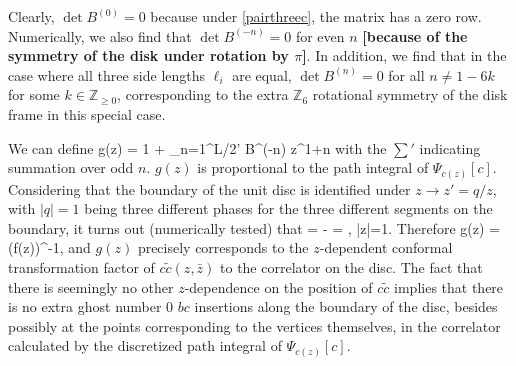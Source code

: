 \documentclass[12pt]{article}
\newcommand{\wt}[1]{\widetilde{#1}}
\newcommand{\fixme}[1]{{\bf {\color{red}[#1]}}}
\begin{document}
Clearly, $\det B^{(0)} = 0$ because under \eqref{pairthreec}, the matrix has a zero row. Numerically, we also find that $\det B^{(-n)} = 0$ for even $n$ \fixme{because of the symmetry of the disk under rotation by $\pi$}. In addition, we find that in the case where all three side lengths $\ell_i$ are equal, $\det B^{(n)} = 0$ for all $n \neq 1-6k$ for some $k\in \mathbb{Z}_{\geq 0}$, corresponding to the extra $\mathbb{Z}_6$ rotational symmetry of the disk frame in this special case.

We can define
\ie
g(z) = 1 + \sum_{n=1}^{L/2}{}' \det B^{(-n)} z^{1+n}
\fe
with the $\sum'$ indicating summation over odd $n$. $g(z)$ is proportional to the path integral of $\Psi_{c(z)}[c]$. Considering that the boundary of the unit disc is identified under $z \to z' = q/z$, with $|q|=1$ being three different phases for the three different segments on the boundary, it turns out (numerically tested) that 
\ie
{} =  \quad \Leftrightarrow \quad - = , \qquad\qquad {}  |z|=1.
\fe 
Therefore
\ie
g(z) = (f(z))^{-1},
\fe
and $g(z)$ precisely corresponds to the $z$-dependent conformal transformation factor of $c\wt{c}(z,\bar z)$ to the correlator on the disc. The fact that there is seemingly no other $z$-dependence on the position of $c\wt{c}$ implies that there is no extra ghost number 0 $bc$ insertions along the boundary of the disc, besides possibly at the points corresponding to the vertices themselves, in the correlator calculated by the discretized path integral of $\Psi_{c(z)}[c]$.

\end{document}
